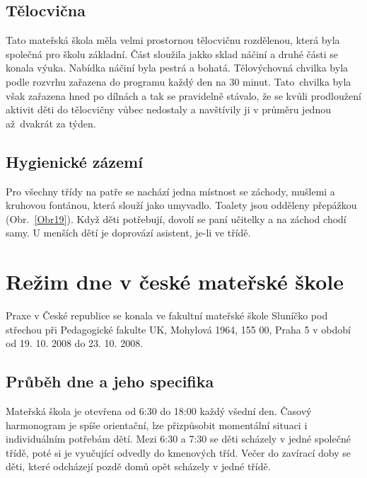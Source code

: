 		\subsection{Tělocvična}
			Tato mateřská škola měla velmi prostornou tělocvičnu rozdělenou, která byla společná pro školu základní. Část sloužila jakko sklad náčiní a druhé části se konala výuka. Nabídka náčiní byla pestrá a bohatá. Tělovýchovná chvilka byla podle rozvrhu zařazena do programu každý den na 30 minut. Tato chvilka byla však zařazena hned po dílnách a tak se pravidelně stávalo, že se kvůli prodloužení aktivit děti do tělocvičny vůbec nedostaly a navštívily ji v průměru jednou až dvakrát za týden. 

		\subsection{Hygienické zázemí}
		\label{zachody}
			Pro všechny třídy na patře se nachází jedna místnost se záchody, mušlemi a kruhovou fontánou, která slouží jako umyvadlo. Toalety jsou odděleny přepážkou (Obr.~\ref{Obr19}). Když děti potřebují, dovolí se paní učitelky a na záchod chodí samy. U menších dětí je doprovází asistent, je-li ve třídě. 
	



\section{Režim dne v české mateřské škole}

		Praxe v České republice se konala ve fakultní mateřské škole Sluníčko pod střechou při Pedagogické fakulte UK, Mohylová 1964, 155 00, Praha 5 v období od 19. 10. 2008 do 23. 10. 2008. 

	\subsection{Průběh dne a jeho specifika}

			Mateřská škola je otevřena od 6:30 do 18:00 každý všední den. Časový harmonogram je spíše orientační, lze přizpůsobit momentální situaci i individuálním potřebám dětí. Mezi 6:30 a 7:30 se děti scházely v jedné společné třídě, poté si je vyučující odvedly do kmenových tříd. Večer do zavírací doby se děti, které odcházejí pozdě domů opět scházely v jedné třídě.

